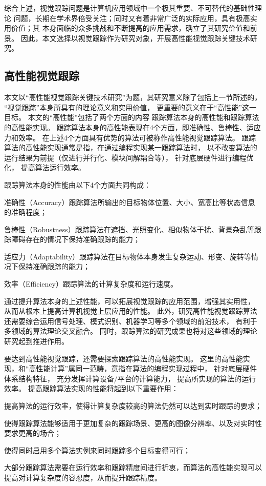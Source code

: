 综合上述，视觉跟踪问题是计算机应用领域中一个极其重要、不可替代的基础性理论
问题，长期在学术界倍受关注；同时又有着非常广泛的实际应用，具有极高实用价值；其
本身面临的众多挑战和不断提高的应用需求，确立了其研究价值和前景。
因此，本文选择以视觉跟踪作为研究对象，开展高性能视觉跟踪关键技术研究。


\subsection{高性能视觉跟踪}
本文以``高性能视觉跟踪关键技术研究''为题，其研究意义除了包括上一节所述的，
``视觉跟踪''本身所具有的理论意义和实用价值，
更重要的意义在于``高性能''这一目标。
本文的``高性能''包括了两个方面的内容\pozhehao 
跟踪算法本身的高性能和跟踪算法的高性能实现。
跟踪算法本身的高性能表现在4个方面，即准确性、鲁棒性、适应力和效率。
在上述4个方面具有优势的算法可被称作高性能视觉跟踪算法。 
跟踪算法的高性能实现通常是指，在通过编程实现某一跟踪算法时，
以不改变算法的运行结果为前提（仅进行并行化、模块间解耦合等），
针对底层硬件进行编程优化， 提高算法运行效率。

跟踪算法本身的性能由以下4个方面共同构成：
\begin{compactitem}
\item 准确性（Accuracy）\pozhehao 跟踪算法所输出的目标物体位置、大小、宽高比等状态信息的准确程度；
\item 鲁棒性（Robustness）\pozhehao 跟踪算法在遮挡、光照变化、相似物体干扰、背景杂乱等跟踪障碍存在的情况下保持准确跟踪的能力；
\item 适应力（Adaptability）\pozhehao 跟踪算法在目标物体本身发生复杂运动、形变、旋转等情况下保持准确跟踪的能力；
\item 效率（Efficiency）\pozhehao 跟踪算法的计算复杂度和运行速度。
\end{compactitem}
通过提升算法本身的上述性能，可以拓展视觉跟踪的应用范围，增强其实用性，
从而从根本上提高计算机视觉上层应用的性能。
此外，研究高性能视觉跟踪算法还需要综合运用信号处理、模式识别、机器学习等多个领域的前沿技术，
有利于多领域的算法理论交叉融合。
同时，跟踪算法的研究成果也将对这些领域的理论研究起到推进作用。

要达到高性能视觉跟踪，还需要探索跟踪算法的高性能实现。
这里的高性能实现，和``高性能计算''属同一范畴，意指在算法的编程实现过程中，
针对底层硬件体系结构特征，
充分发挥计算设备/平台的计算能力，
提高所实现的算法的运行效率。
提高跟踪算法实现的性能将起到以下重要作用：
\begin{compactitem}
\item	提高算法的运行效率，使得计算复杂度较高的算法仍然可以达到实时跟踪的要求；
\item	使得跟踪算法能够适用于更加复杂的跟踪场景、更高的图像分辨率、以及对实时性要求更高的场合；
\item	使得同时启用多个算法实例来同时跟踪多个目标变得可行；
\item	大部分跟踪算法需要在运行效率和跟踪精度间进行折衷，而算法的高性能实现可以提高对计算复杂度的容忍度，从而提升跟踪精度。
\end{compactitem}

